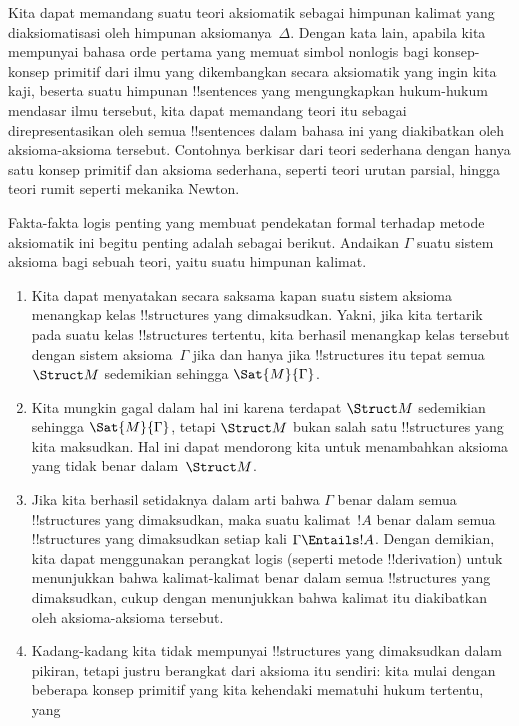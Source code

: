 \documentclass[../../../include/open-logic-section]{subfiles}
\begin{document}
\begin{explain}
Kita dapat memandang suatu teori aksiomatik sebagai himpunan kalimat yang
diaksiomatisasi oleh himpunan aksiomanya~$\Delta$. Dengan kata lain, apabila
kita mempunyai bahasa orde pertama yang memuat simbol nonlogis bagi
konsep-konsep primitif dari ilmu yang dikembangkan secara aksiomatik yang ingin
kita kaji, beserta suatu himpunan !!{sentence}s yang mengungkapkan hukum-hukum
mendasar ilmu tersebut, kita dapat memandang teori itu sebagai direpresentasikan
oleh semua !!{sentence}s dalam bahasa ini yang diakibatkan oleh aksioma-aksioma
tersebut. Contohnya berkisar dari teori sederhana dengan hanya satu konsep
primitif dan aksioma sederhana, seperti teori urutan parsial, hingga teori
rumit seperti mekanika Newton.

Fakta-fakta logis penting yang membuat pendekatan formal terhadap metode
aksiomatik ini begitu penting adalah sebagai berikut. Andaikan $\Gamma$ suatu
sistem aksioma bagi sebuah teori, yaitu suatu himpunan kalimat.
\begin{enumerate}
\item Kita dapat menyatakan secara saksama kapan suatu sistem aksioma menangkap
  kelas !!{structure}s yang dimaksudkan. Yakni, jika kita tertarik pada suatu
  kelas !!{structure}s tertentu, kita berhasil menangkap kelas tersebut dengan
  sistem aksioma~$\Gamma$ jika dan hanya jika !!{structure}s itu tepat
  semua~$\Struct M$ sedemikian sehingga $\Sat{M}{\Gamma}$.
\item Kita mungkin gagal dalam hal ini karena terdapat $\Struct M$ sedemikian
  sehingga $\Sat{M}{\Gamma}$, tetapi $\Struct M$ bukan salah satu
  !!{structure}s yang kita maksudkan. Hal ini dapat mendorong kita untuk
  menambahkan aksioma yang tidak benar dalam~$\Struct M$.
\item Jika kita berhasil setidaknya dalam arti bahwa $\Gamma$ benar dalam
  semua !!{structure}s yang dimaksudkan, maka suatu kalimat~$!A$ benar dalam
  semua !!{structure}s yang dimaksudkan setiap kali $\Gamma \Entails !A$.
  Dengan demikian, kita dapat menggunakan perangkat logis (seperti metode
  !!{derivation}) untuk menunjukkan bahwa kalimat-kalimat benar dalam semua
  !!{structure}s yang dimaksudkan, cukup dengan menunjukkan bahwa kalimat itu
  diakibatkan oleh aksioma-aksioma tersebut.
\item Kadang-kadang kita tidak mempunyai !!{structure}s yang dimaksudkan dalam
  pikiran, tetapi justru berangkat dari aksioma itu sendiri: kita mulai dengan
  beberapa konsep primitif yang kita kehendaki mematuhi hukum tertentu, yang

\end{enumerate}
\end{explain}
\end{document}
